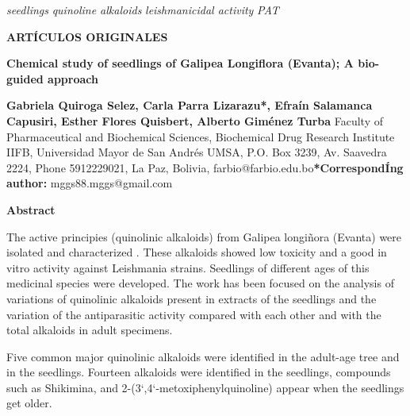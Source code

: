 \documentclass{article}
\begin{document}
\textit{seedlings}
\textit{quinoline alkaloids}
\textit{leishmanicidal activity}
\textit{PAT}

\begin{FlushRight}
\textbf{ARTÍCULOS ORIGINALES}
\end{FlushRight}

\begin{FlushRight}
\end{FlushRight}

\begin{Center}
\textbf{Chemical study of seedlings of Galipea Longiflora (Evanta); A bio-guided
approach}
\end{Center}

\begin{Center}
\end{Center}

\begin{Center}
\end{Center}

\begin{Center}
\textbf{Gabriela Quiroga Selez, Carla Parra Lizarazu*, Efraín Salamanca
Capusiri, Esther Flores Quisbert, Alberto Giménez Turba }
Faculty of Pharmaceutical and Biochemical Sciences, Biochemical Drug Research
Institute IIFB, Universidad Mayor de San Andrés UMSA, P.O. Box 3239, Av.
Saavedra 2224, Phone 5912229021, La Paz, Bolivia,
farbio@farbio.edu.bo\textbf{*CorrespondÍng author:}
mggs88.mggs@gmail.com\end{Center}

\begin{Center}
\end{Center}

\begin{Center}
\end{Center}

\textbf{Abstract}

The active principies (quinolinic alkaloids) from Galipea longiñora (Evanta)
were isolated and characterized . These alkaloids showed low toxicity and a good
in vitro activity against Leishmania strains. Seedlings of different ages of
this medicinal species were developed. The work has been focused on the analysis
of variations of quinolinic alkaloids present in extracts of the seedlings and
the variation of the antiparasitic activity compared with each other and with
the total alkaloids in adult specimens.

Five common major quinolinic alkaloids were identified in the adult-age tree and
in the seedlings. Fourteen alkaloids were identified in the seedlings, compounds
such as Shikimina, and 2-(3`,4`-metoxiphenylquinoline) appear when the seedlings
get older.
\end{document}
